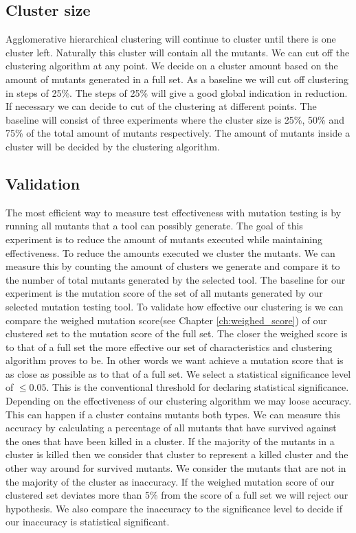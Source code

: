 \documentclass[../../main]{subfiles}
\begin{document}
\subsection{Cluster size}
Agglomerative hierarchical clustering will continue to cluster until there is one cluster left. 
Naturally this cluster will contain all the mutants.
We can cut off the clustering algorithm at any point.
We decide on a cluster amount based on the amount of mutants generated in a full set.
As a baseline we will cut off clustering in steps of 25\%.
The steps of 25\% will give a good global indication in reduction.
If necessary we can decide to cut of the clustering at different points.
The baseline will consist of three experiments where the cluster size is 25\%, 50\% and 75\% of the total amount of mutants respectively.
The amount of mutants inside a cluster will be decided by the clustering algorithm.

\subsection{Validation}
\label{ch:exp1_validation}
The most efficient way to measure test effectiveness with mutation testing is by running all mutants that a tool can possibly generate.
The goal of this experiment is to reduce the amount of mutants executed while maintaining effectiveness.
To reduce the amounts executed we cluster the mutants. 
We can measure this by counting the amount of clusters we generate and compare it to the number of total mutants generated by the selected tool.
\newline
The baseline for our experiment is the mutation score of the set of all mutants generated by our selected mutation testing tool.
\newline
To validate how effective our clustering is we can compare the weighed mutation score(see Chapter \ref{ch:weighed_score}) of our clustered set to the mutation score of the full set.
The closer the weighed score is to that of a full set the more effective our set of characteristics and clustering algorithm proves to be.
In other words we want achieve a mutation score that is as close as possible as to that of a full set.
We select a statistical significance level of $\leq 0.05$.
This is the conventional threshold for declaring statistical significance\cite{Kirk1996PracticalCome}.
\newline
Depending on the effectiveness of our clustering algorithm we may loose accuracy.
This can happen if a cluster contains mutants both types. 
We can measure this accuracy by calculating a percentage of all mutants that have survived against the ones that have been killed in a cluster.
If the majority of the mutants in a cluster is killed then we consider that cluster to represent a killed cluster and the other way around for survived mutants.
We consider the mutants that are not in the majority of the cluster as inaccuracy.
\newline
If the weighed mutation score of our clustered set deviates more than 5\% from the score of a full set we will reject our hypothesis.
We also compare the inaccuracy to the significance level to decide if our inaccuracy is statistical significant.
\end{document}
